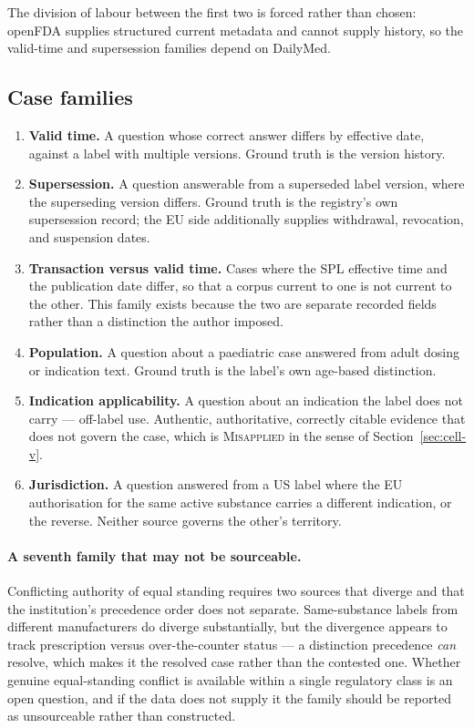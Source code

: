 The division of labour between the first two is forced rather than chosen: openFDA
supplies structured current metadata and cannot supply history, so the valid-time and
supersession families depend on DailyMed.

\subsection{Case families}

\begin{enumerate}
  \item \textbf{Valid time.} A question whose correct answer differs by effective date,
        against a label with multiple versions. Ground truth is the version history.
  \item \textbf{Supersession.} A question answerable from a superseded label version,
        where the superseding version differs. Ground truth is the registry's own
        supersession record; the EU side additionally supplies withdrawal, revocation,
        and suspension dates.
  \item \textbf{Transaction versus valid time.} Cases where the SPL effective time and
        the publication date differ, so that a corpus current to one is not current to
        the other. This family exists because the two are separate recorded fields
        rather than a distinction the author imposed.
  \item \textbf{Population.} A question about a paediatric case answered from adult
        dosing or indication text. Ground truth is the label's own age-based
        distinction.
  \item \textbf{Indication applicability.} A question about an indication the label does
        not carry --- off-label use. Authentic, authoritative, correctly citable
        evidence that does not govern the case, which is
        \textsc{Misapplied} in the sense of Section~\ref{sec:cell-v}.
  \item \textbf{Jurisdiction.} A question answered from a US label where the EU
        authorisation for the same active substance carries a different indication, or
        the reverse. Neither source governs the other's territory.
\end{enumerate}

\paragraph{A seventh family that may not be sourceable.} Conflicting authority of equal
standing requires two sources that diverge and that the institution's precedence order
does not separate. Same-substance labels from different manufacturers do diverge
substantially, but the divergence appears to track prescription versus
over-the-counter status --- a distinction precedence \emph{can} resolve, which makes it
the resolved case rather than the contested one. Whether genuine equal-standing conflict
is available within a single regulatory class is an open question, and if the data does
not supply it the family should be reported as unsourceable rather than constructed.


